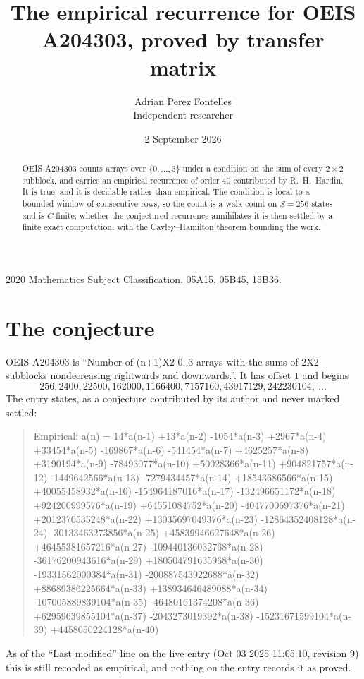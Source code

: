 \documentclass[11pt,a4paper]{article}
\title{The empirical recurrence for OEIS A204303, proved by transfer matrix}
\author{Adrian Perez Fontelles\\ \small Independent researcher}
\date{2 September 2026}
\theoremstyle{plain}
\theoremstyle{definition}
\begin{document}
\maketitle

\begin{abstract}
OEIS A204303 counts arrays over $\{0,\dots,3\}$ under a condition on the sum of every
$2\times2$ subblock, and carries an empirical recurrence of order $40$ contributed by
R.~H.~Hardin. It is true, and it is decidable rather than empirical. The condition is local to
a bounded window of consecutive rows, so the count is a walk count on $S=256$ states and is
$C$-finite; whether the conjectured recurrence annihilates it is then settled by a finite exact
computation, with the Cayley--Hamilton theorem bounding the work.
\end{abstract}

\noindent\small 2020 Mathematics Subject Classification. 05A15, 05B45, 15B36.\normalsize

\section{The conjecture}

OEIS A204303 is ``Number of (n+1)X2 0..3 arrays with the sums of 2X2 subblocks nondecreasing rightwards and downwards.''. It has offset $1$ and begins
\[
256, 2400, 22500, 162000, 1166400, 7157160, 43917129, 242230104,\ \dots
\]
The entry states, as a conjecture contributed by its author and never marked settled:
\begin{quote}
Empirical: a(n) = 14*a(n-1) +13*a(n-2) -1054*a(n-3) +2967*a(n-4) +33454*a(n-5) -169867*a(n-6) -541454*a(n-7) +4625257*a(n-8) +3190194*a(n-9) -78493077*a(n-10) +50028366*a(n-11) +904821757*a(n-12) -1449642566*a(n-13) -7279434457*a(n-14) +18543686566*a(n-15) +40055458932*a(n-16) -154964187016*a(n-17) -132496651172*a(n-18) +924200999576*a(n-19) +64551084752*a(n-20) -4047700697376*a(n-21) +2012370535248*a(n-22) +13035697049376*a(n-23) -12864352408128*a(n-24) -30133463273856*a(n-25) +45839946627648*a(n-26) +46455381657216*a(n-27) -109440136032768*a(n-28) -36176200943616*a(n-29) +180504791635968*a(n-30) -19331562000384*a(n-31) -200887543922688*a(n-32) +88689386225664*a(n-33) +138934646489088*a(n-34) -107005889839104*a(n-35) -46480161374208*a(n-36) +62959639855104*a(n-37) -2043273019392*a(n-38) -15231671599104*a(n-39) +4458050224128*a(n-40)
\end{quote}
As of the ``Last modified'' line on the live entry (Oct 03 2025 11:05:10, revision 9) this is still
recorded as empirical, and nothing on the entry records it as proved.
\end{document}
